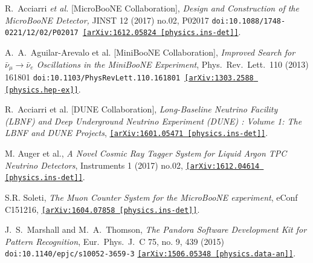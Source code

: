 \documentclass[a4paper,11pt]{article}
\begin{document}
\begin{thebibliography}{99}
   R.~Acciarri {\it et al.} [MicroBooNE Collaboration],
  \textit{Design and Construction of the MicroBooNE Detector,}
  JINST 12 (2017) no.02,  P02017
  \texttt{doi:10.1088/1748-0221/12/02/P02017
  \href{https://arxiv.org/abs/1303.2588}{[arXiv:1612.05824 [physics.ins-det]]}}.

   A.~A.~Aguilar-Arevalo et al. [MiniBooNE Collaboration], \textit{Improved Search for $\bar \nu_\mu \rightarrow \bar \nu_e$ Oscillations in the MiniBooNE Experiment}, Phys.\ Rev.\ Lett.\  110 (2013) 161801 \texttt{doi:10.1103/PhysRevLett.110.161801 \href{https://arxiv.org/abs/1303.2588}{[arXiv:1303.2588 [physics.hep-ex]]}}.

   R.~Acciarri et al. [DUNE Collaboration], \textit{Long-Baseline Neutrino Facility (LBNF) and Deep Underground Neutrino Experiment (DUNE) : Volume 1: The LBNF and DUNE Projects}, \href{https://arxiv.org/abs/1601.05471}{\texttt{[arXiv:1601.05471 [physics.ins-det]]}}.


   M. Auger et al., \textit{A Novel Cosmic Ray Tagger System for Liquid Argon TPC Neutrino Detectors}, Instruments 1 (2017) no.02, \texttt{\href{https://arxiv.org/abs/1612.04614}{[arXiv:1612.04614 [physics.ins-det]]}}.

   S.R. Soleti, \textit{The Muon Counter System for the MicroBooNE experiment}, eConf C151216, \texttt{\href{https://arxiv.org/abs/1604.07858}{[arXiv:1604.07858 [physics.ins-det]]}}.


   J.~S.~Marshall and M.~A.~Thomson, \textit{The Pandora Software Development Kit for Pattern Recognition}, Eur.\ Phys.\ J.\ C 75, no. 9, 439 (2015) \texttt{doi:10.1140/epjc/s10052-3659-3} \texttt{\href{https://arxiv.org/abs/1506.05348}{[arXiv:1506.05348 [physics.data-an]]}}.


\end{thebibliography}
\end{document}
